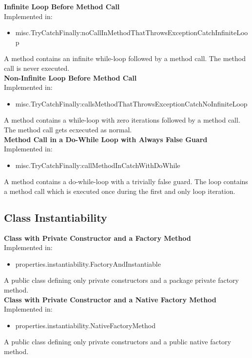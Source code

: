 \documentclass{article}
\begin{document}
\noindent
\textbf{Infinite Loop Before Method Call}\\
Implemented in: 
\begin{itemize}
    \item misc.TryCatchFinally:noCallInMethodThatThrowsExceptionCatchInfiniteLoop
\end{itemize}
A method contains an infinite while-loop followed by a method call. The method call is never executed.\\

\noindent
\textbf{Non-Infinite Loop Before Method Call}\\
Implemented in: 
\begin{itemize}
    \item misc.TryCatchFinally:callsMethodThatThrowsExceptionCatchNoInfiniteLoop
\end{itemize}
A method contains a while-loop with zero iterations followed by a method call. The method call gets ecxecuted as normal.\\

\noindent
\textbf{Method Call in a Do-While Loop with Always False Guard}\\
Implemented in: 
\begin{itemize}
    \item misc.TryCatchFinally:callMethodInCatchWithDoWhile
\end{itemize}
A method contains a do-while-loop with a trivially false guard. The loop contains a method call which is executed once during the first and only loop iteration.\\

    
\subsection{Class Instantiability}

\textbf{Class with Private Constructor and a Factory Method}\\
Implemented in: 
\begin{itemize}
    \item properties.instantiability.FactoryAndInstantiable
\end{itemize}
A public class defining only private constructors and a package private factory method.\\

\noindent
\textbf{Class with Private Constructor and a Native Factory Method}\\
Implemented in: 
\begin{itemize}
    \item properties.instantiability.NativeFactoryMethod
\end{itemize}
A public class defining only private constructors and a public native factory method.\\
\end{document}
